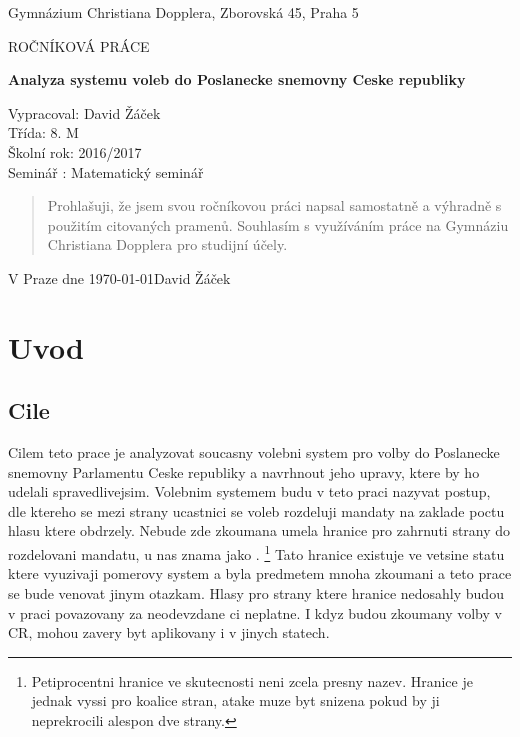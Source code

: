 \documentclass[12pt,a4paper]{report}
\begin{document}
\begin{titlepage}
	\begin{center}
	{\large Gymnázium Christiana Dopplera, Zborovská 45, Praha 5 \par}
	\vfill
	\par\vspace{1cm}
	{\scshape\LARGE ROČNÍKOVÁ PRÁCE \par}
	{\huge\bfseries Analyza systemu voleb do Poslanecke snemovny Ceske republiky\par}
	\vfill
\end{center}
Vypracoval: David Žáček \\
Třída: 8. M \\
Školní rok: 2016/2017 \\
Seminář : Matematický seminář \\
	\vfill
\end{titlepage}

\vspace*{\fill}
\begin{quote}
Prohlašuji, že jsem svou ročníkovou práci napsal samostatně a výhradně s
použitím 
citovaných pramenů. Souhlasím s
využíváním 
práce na Gymnáziu Christiana Dopplera 
pro studijní účely. \\
\end{quote}

V Praze dne \today \hfill David Žáček

\vspace*{\fill}
\thispagestyle{empty}
\newpage
\tableofcontents
\newpage
\chapter{Uvod}
\section{Cile}
Cilem teto prace je analyzovat soucasny volebni system  pro volby do Poslanecke snemovny Parlamentu Ceske republiky a navrhnout jeho upravy, ktere by ho udelali spravedlivejsim. 
Volebnim systemem budu v teto praci nazyvat postup, dle ktereho se mezi strany ucastnici se voleb rozdeluji mandaty na zaklade poctu hlasu ktere obdrzely. 
Nebude zde zkoumana umela hranice pro zahrnuti strany do rozdelovani mandatu, u nas znama jako .
\footnote{Petiprocentni hranice ve skutecnosti neni zcela presny nazev. Hranice je jednak vyssi pro koalice stran, atake muze byt snizena pokud by ji neprekrocili alespon dve strany.\autocite{ZAK}}
Tato hranice existuje ve vetsine statu ktere vyuzivaji pomerovy system a byla predmetem mnoha zkoumani a teto prace se bude venovat jinym otazkam.
Hlasy pro strany ktere hranice nedosahly budou v praci povazovany za neodevzdane ci neplatne.
I kdyz budou zkoumany volby v CR, mohou zavery byt aplikovany i v jinych statech. 
\end{document}
